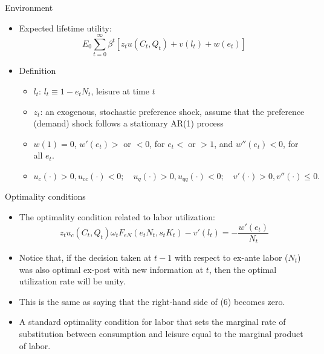 \documentclass[fontset=windows,12pt,t,aspectratio=169]{beamer}
\begin{document}
\begin{frame}{Environment}
    \begin{itemize}

        \item Expected lifetime utility:
        \[ E_0 \sum_{t=0}^{\infty} \beta^t \left[ z_t u(C_t, Q_t) + v(l_t) + w(e_t) \right]  \tag{3} \]
        \item Definition
        \begin{itemize}
            \item $l_t$: $l_t \equiv 1 - e_t N_t$, leisure at time $t$
            \item $z_t$: an exogenous, stochastic preference shock, assume that the preference (demand) shock follows a stationary AR(1) process
            \item $w(1) = 0$, $w'(e_t) > $ or $< 0$, for $e_t < $ or $> 1$, and $w''(e_t) < 0$, for all $e_t$.
            \item $u_c(\cdot) > 0, u_{cc}(\cdot) < 0; \quad u_q(\cdot) > 0, u_{qq}(\cdot) < 0; \quad v'(\cdot) > 0, v''(\cdot) \leq 0.$

        \end{itemize}
    \end{itemize}
\end{frame}

\begin{frame}{Optimality conditions}
    \begin{itemize}
        \item The optimality condition related to labor utilization:
        \[    z_t u_c(C_t, Q_t) \omega_t F_{eN}(e_t N_t, s_t K_t) - v'(l_t) = -\frac{w'(e_t)}{N_t} \tag{6} \]
        \item  Notice that, if the decision taken at $t - 1$ with respect to ex-ante labor ($N_t$) was also optimal ex-post with new information at $t$, then the optimal utilization rate will be unity.
        \item This is the same as saying that the right-hand side of (6) becomes zero.
        \item A standard optimality condition for labor that sets the marginal rate of substitution between consumption and leisure equal to the marginal product of labor.
    \end{itemize}
\end{frame}
\end{document}
